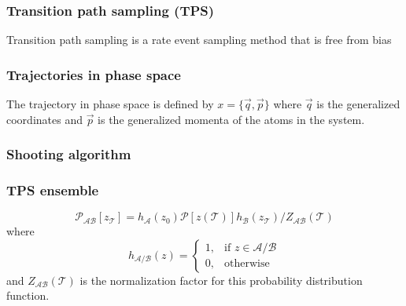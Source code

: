 \documentclass{beamer}
\begin{document}
\begin{frame}
\frametitle{Transition path sampling (TPS)}
Transition path sampling is a rate event sampling method 
that is free from bias
\end{frame}
\begin{frame}
\frametitle{Trajectories in phase space}
\newline
The trajectory in phase space is defined by $x = \{\vec{q},\vec{p}\}$ where $\vec{q}$ 
is the generalized coordinates and $\vec{p}$ is the generalized momenta of the 
atoms in the system. 
\end{frame}
\begin{frame}
\frametitle{Shooting algorithm}

\end{frame}
\begin{frame}
\frametitle{TPS ensemble}
\begin{equation}
\mathcal{P}_{\mathcal{AB}}[z_{\mathcal{T}}] = h_{\mathcal{A}}(z_0)\mathcal{P}[z(\mathcal{T})]
h_{\mathcal{B}}(z_{\mathcal{T}})/Z_{\mathcal{AB}}(\mathcal{T})\label{eqn:tpsensem}
\end{equation}
where 
\[
    h_{\mathcal{A}/\mathcal{B}}(z)= 
\begin{cases}
    1, & \text{if } z\in \mathcal{A}/\mathcal{B}\\
    0,              & \text{otherwise}
\end{cases}
\]
and $Z_{\mathcal{AB}}(\mathcal{T})$ is the normalization factor for this 
probability distribution function.
\end{frame}
\end{document}
